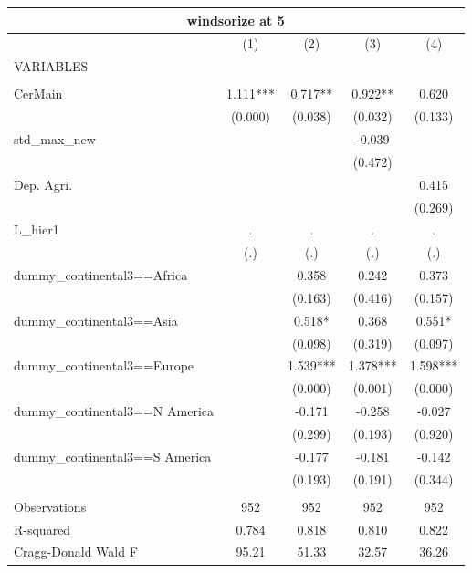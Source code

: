 \begin{tabular}{lcccc}
\multicolumn{5}{c}{windsorize at 5} \\ \hline
 & (1) & (2) & (3) & (4) \\
VARIABLES &  &  &  &  \\ \hline
 &  &  &  &  \\
CerMain & 1.111*** & 0.717** & 0.922** & 0.620 \\
 & (0.000) & (0.038) & (0.032) & (0.133) \\
std\_max\_new &  &  & -0.039 &  \\
 &  &  & (0.472) &  \\
Dep. Agri. &  &  &  & 0.415 \\
 &  &  &  & (0.269) \\
L\_hier1 & . & . & . & . \\
 & (.) & (.) & (.) & (.) \\
dummy\_continental3==Africa &  & 0.358 & 0.242 & 0.373 \\
 &  & (0.163) & (0.416) & (0.157) \\
dummy\_continental3==Asia &  & 0.518* & 0.368 & 0.551* \\
 &  & (0.098) & (0.319) & (0.097) \\
dummy\_continental3==Europe &  & 1.539*** & 1.378*** & 1.598*** \\
 &  & (0.000) & (0.001) & (0.000) \\
dummy\_continental3==N America &  & -0.171 & -0.258 & -0.027 \\
 &  & (0.299) & (0.193) & (0.920) \\
dummy\_continental3==S America &  & -0.177 & -0.181 & -0.142 \\
 &  & (0.193) & (0.191) & (0.344) \\
 &  &  &  &  \\
Observations & 952 & 952 & 952 & 952 \\
R-squared & 0.784 & 0.818 & 0.810 & 0.822 \\
 Cragg-Donald Wald F & 95.21 & 51.33 & 32.57 & 36.26 \\ \hline
\end{tabular}
